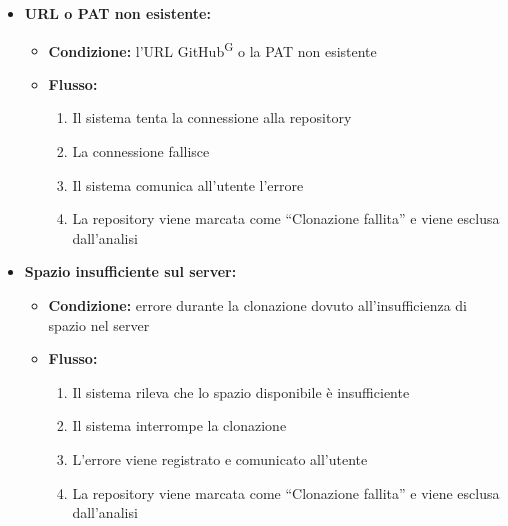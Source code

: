 \documentclass[a4paper, 11pt]{article}
\begin{document}
\begin{itemize}
	\begin{itemize}
		\item \textbf{URL o PAT non esistente:} 
			\begin{itemize}
				\item \textbf{Condizione:} l'URL GitHub\textsuperscript{G} o la PAT non esistente
				\item \textbf{Flusso:} 
				\begin{enumerate}
					\item Il sistema tenta la connessione alla repository
					\item La connessione fallisce
					\item Il sistema comunica all'utente l'errore
					\item La repository viene marcata come “Clonazione fallita” e viene esclusa dall'analisi
				\end{enumerate}
			\end{itemize}
		\item \textbf{Spazio insufficiente sul server:} 
			\begin{itemize}
				\item \textbf{Condizione:} errore durante la clonazione dovuto all'insufficienza di spazio nel server
				\item \textbf{Flusso:} 
				\begin{enumerate}
					\item Il sistema rileva che lo spazio disponibile è insufficiente
					\item Il sistema interrompe la clonazione
					\item L'errore viene registrato e comunicato all'utente
					\item La repository viene marcata come “Clonazione fallita” e viene esclusa dall'analisi
				\end{enumerate}
			\end{itemize}
	\end{itemize}
\end{itemize}
\end{document}
